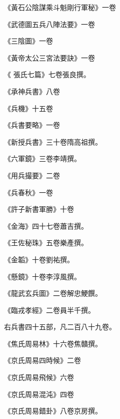 \begin{pinyinscope}
 《黃石公陰謀乘斗魁剛行軍秘》一卷



 《武德圖五兵八陣法要》一卷



 《三陰圖》一卷



 《黃帝太公三宮法要訣》一卷



 《
 張氏七篇》七卷張良撰。



 《承神兵書》八卷



 《兵機》十五卷



 《兵書要略》一卷



 《新授兵書》三十卷隋高祖撰。



 《六軍鏡》三卷李靖撰。



 《用兵撮要》二卷



 《兵春秋》一卷



 《許子新書軍勝》十卷



 《金海》四十七卷蕭吉撰。



 《王佐秘珠》五卷樂產撰。



 《金韜》十卷劉祐撰。



 《懸鏡》十卷李淳風撰。



 《龍武玄兵圖》二卷解忠鯁饌。



 《臨戎孝經》二卷員半千撰。



 右兵書四十五部，凡二百八十九卷。



 《焦氏周易林》十六卷焦贛撰。



 《京氏周易四時候》二卷



 《京氏周易飛候》六卷



 《京氏周易混沌》四卷



 《京氏周易錯卦》八卷京房撰。




\end{pinyinscope}

